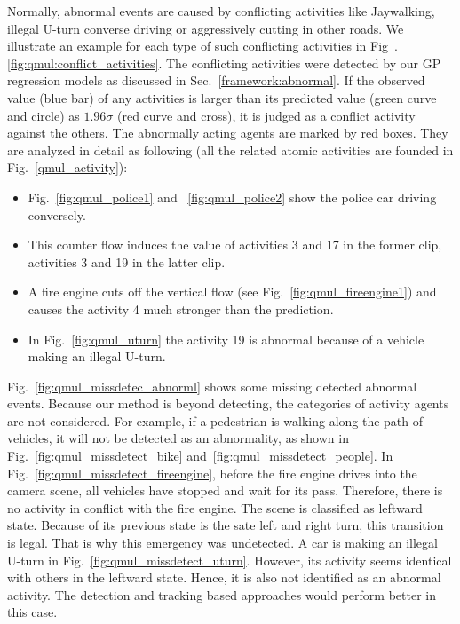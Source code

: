Normally, abnormal events are caused by conflicting activities like Jaywalking, illegal U-turn converse driving or aggressively cutting in other roads. 
We illustrate an example for each type of such conflicting activities in Fig~.\ref{fig:qmul:conflict_activities}. 
The conflicting activities were detected by our GP regression models as discussed in Sec.~\ref{framework:abnormal}. If the observed value (blue bar) of any activities is larger than its predicted value (green curve and circle) as $1.96\sigma$ (red curve and cross), it is judged as a conflict activity against the others. The abnormally acting agents are marked by red boxes. 
They are analyzed in detail as following (all the related atomic activities are founded in Fig.~\ref{qmul_activity}):
\begin{itemize}
	\item Fig.~\ref{fig:qmul_police1} and ~\ref{fig:qmul_police2} show the police car driving conversely.
	\item This counter flow induces the value of activities 3 and 17 in the former clip, activities 3 and 19 in the latter clip. 
	\item A fire engine cuts off the vertical flow (see Fig.~\ref{fig:qmul_fireengine1}) and causes the activity 4 much stronger than the prediction.
	\item In Fig.~\ref{fig:qmul_uturn} the activity 19 is abnormal because of a vehicle making an illegal U-turn. 
\end{itemize}

Fig.~\ref{fig:qmul_missdetec_abnorml} shows some missing detected abnormal events. Because our method is beyond detecting, the categories of activity agents are not considered. For example, if a pedestrian is walking along the path of vehicles, it will not be detected as an abnormality, as shown in Fig.~\ref{fig:qmul_missdetect_bike} and~\ref{fig:qmul_missdetect_people}. 
In Fig.~\ref{fig:qmul_missdetect_fireengine}, before the fire engine drives into the camera scene, all vehicles have stopped and wait for its pass. Therefore, there is no activity in conflict with the fire engine. The scene is classified as leftward state. Because of its previous state is the sate left and right turn, this transition is legal. That is why this emergency was undetected.
A car is making an illegal U-turn in Fig.~\ref{fig:qmul_missdetect_uturn}. However, its activity seems identical with others in the leftward state. Hence, it is also not identified as an abnormal activity. The detection and tracking based approaches would perform better in this case.

